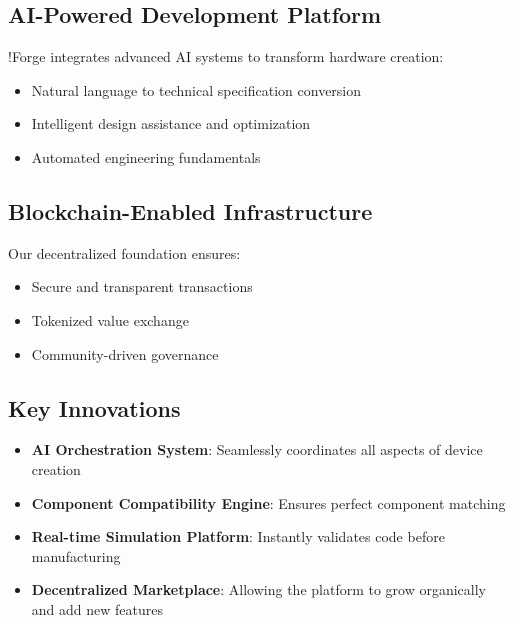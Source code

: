 \subsection{AI-Powered Development Platform}
!Forge integrates advanced AI systems to transform hardware creation:
\begin{itemize}[leftmargin=*]
    \item Natural language to technical specification conversion
    \item Intelligent design assistance and optimization
    \item Automated engineering fundamentals
\end{itemize}

\subsection{Blockchain-Enabled Infrastructure}
Our decentralized foundation ensures:
\begin{itemize}[leftmargin=*]
    \item Secure and transparent transactions
    \item Tokenized value exchange
    \item Community-driven governance
\end{itemize}

\subsection{Key Innovations}
\begin{itemize}[leftmargin=*]
    \item \textbf{AI Orchestration System}: Seamlessly coordinates all aspects of device creation
    \item \textbf{Component Compatibility Engine}: Ensures perfect component matching
    \item \textbf{Real-time Simulation Platform}: Instantly validates code before manufacturing
    \item \textbf{Decentralized Marketplace}: Allowing the platform to grow organically and add new features
\end{itemize} 